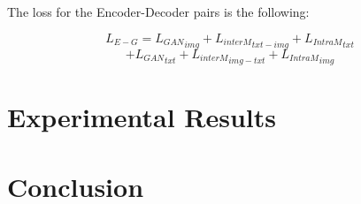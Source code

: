\documentclass[twocolumn]{article}
\begin{document}
The loss for the Encoder-Decoder pairs is the following:

\[ L_{E-G} =
  {L_{GAN}}_{img} +
    {L_{interM}}_{txt-img} +
    {L_{IntraM}}_{txt} 
 \]
 \[ +
   {L_{GAN}}_{txt} +
    {L_{interM}}_{img-txt} +
    {L_{IntraM}}_{img}
\]


\section{Experimental Results}

\section{Conclusion}

{}

\end{document}
